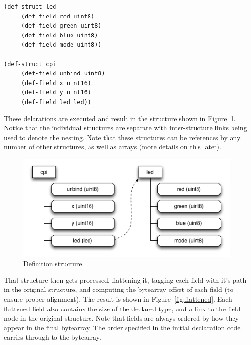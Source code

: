 \documentclass[12pt]{article}
\begin{document}
\begin{verbatim}
(def-struct led
     (def-field red uint8)
     (def-field green uint8)
     (def-field blue uint8)
     (def-field mode uint8))

(def-struct cpi
     (def-field unbind uint8)
     (def-field x uint16)
     (def-field y uint16)
     (def-field led led))
\end{verbatim}

These delarations are executed and result in the structure shown in
Figure~\ref{fig:defstructure}. Notice that the individual structures
are separate with inter-structure links being used to denote the
nesting. Note that these structures can be references by any number of
other structures, as well as arrays (more details on this later).

\begin{figure}[htbp] %
   \centering
   \includegraphics[width=5in]{def_structure.png} 
\caption{Definition structure.}
\label{fig:defstructure}
\end{figure}

That structure then gets processed, flattening it, tagging each field
with it's path in the original structure, and computing the bytearray
offset of each field (to ensure proper alignment). The result is shown
in Figure~\ref{fig:flattened}. Each flattened field also contains the
size of the declared type, and a link to the field node in the
original structure. Note that fields are always ordered by how they
appear in the final bytearray. The order specified in the initial
declaration code carries through to the bytearray.
\end{document}
